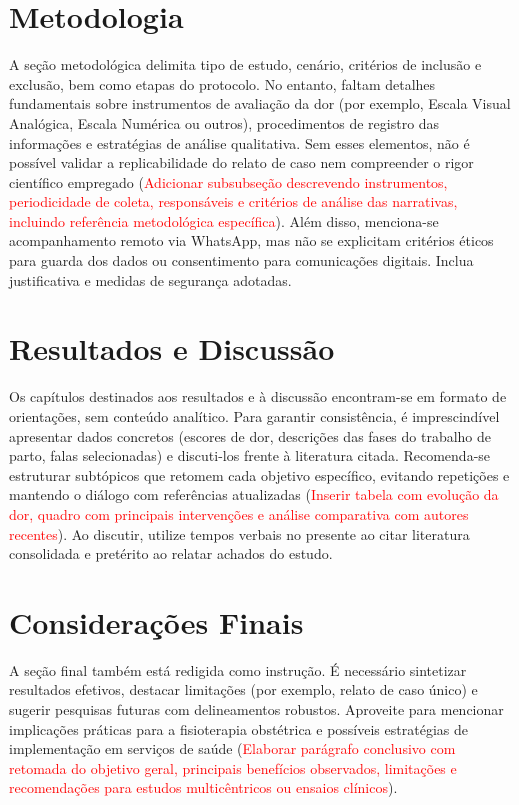 \documentclass[12pt,oneside,a4paper]{article}
\begin{document}
\section*{Metodologia}
A seção metodológica delimita tipo de estudo, cenário, critérios de inclusão e exclusão, bem como etapas do protocolo. No entanto, faltam detalhes fundamentais sobre instrumentos de avaliação da dor (por exemplo, Escala Visual Analógica, Escala Numérica ou outros), procedimentos de registro das informações e estratégias de análise qualitativa. Sem esses elementos, não é possível validar a replicabilidade do relato de caso nem compreender o rigor científico empregado (\textcolor{red}{Adicionar subsubseção descrevendo instrumentos, periodicidade de coleta, responsáveis e critérios de análise das narrativas, incluindo referência metodológica específica}). Além disso, menciona-se acompanhamento remoto via WhatsApp, mas não se explicitam critérios éticos para guarda dos dados ou consentimento para comunicações digitais. Inclua justificativa e medidas de segurança adotadas.

\section*{Resultados e Discussão}
Os capítulos destinados aos resultados e à discussão encontram-se em formato de orientações, sem conteúdo analítico. Para garantir consistência, é imprescindível apresentar dados concretos (escores de dor, descrições das fases do trabalho de parto, falas selecionadas) e discuti-los frente à literatura citada. Recomenda-se estruturar subtópicos que retomem cada objetivo específico, evitando repetições e mantendo o diálogo com referências atualizadas (\textcolor{red}{Inserir tabela com evolução da dor, quadro com principais intervenções e análise comparativa com autores recentes}). Ao discutir, utilize tempos verbais no presente ao citar literatura consolidada e pretérito ao relatar achados do estudo.

\section*{Considerações Finais}
A seção final também está redigida como instrução. É necessário sintetizar resultados efetivos, destacar limitações (por exemplo, relato de caso único) e sugerir pesquisas futuras com delineamentos robustos. Aproveite para mencionar implicações práticas para a fisioterapia obstétrica e possíveis estratégias de implementação em serviços de saúde (\textcolor{red}{Elaborar parágrafo conclusivo com retomada do objetivo geral, principais benefícios observados, limitações e recomendações para estudos multicêntricos ou ensaios clínicos}).
\end{document}
